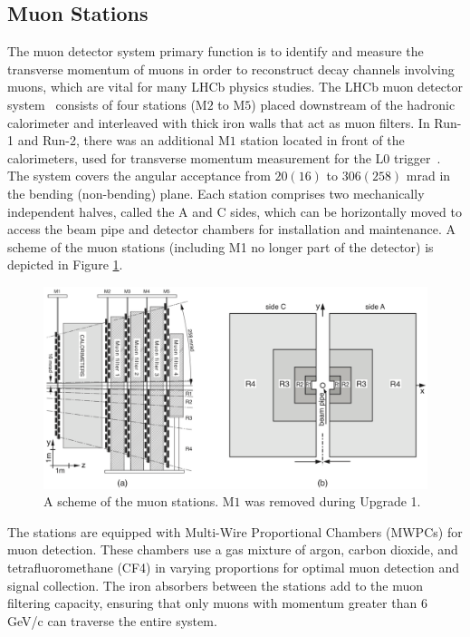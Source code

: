 \subsection{Muon Stations}

The muon detector system primary function is to identify and measure the transverse momentum of muons in order to reconstruct decay channels involving muons, which are vital for many LHCb physics studies.
The LHCb muon detector system~\cite{Alves_2013} consists of four stations (M$2$ to M$5$) placed downstream of the hadronic calorimeter and interleaved with thick iron walls that act as muon filters. In Run-1 and Run-2, there was an additional M$1$ station located in front of the calorimeters, used for transverse momentum measurement for the L$0$ trigger~\cite{muon_upgrade}. The system covers the angular acceptance from $20 (16)$ to $306 (258)$ mrad in the bending (non-bending) plane. Each station comprises two mechanically independent halves, called the A and C sides, which can be horizontally moved to access the beam pipe and detector chambers for installation and maintenance.
A scheme of the muon stations (including M1 no longer part of the detector) is depicted in Figure \ref{fig:muon}.
\begin{figure}
    \centering
    \includegraphics[width=\textwidth]{figures/muon.png}
    \caption{A scheme of the muon stations. M$1$ was removed during Upgrade 1.}
    \label{fig:muon}
\end{figure}
The stations are equipped with Multi-Wire Proportional Chambers (MWPCs) for muon detection. These chambers use a gas mixture of argon, carbon dioxide, and tetrafluoromethane (CF4) in varying proportions for optimal muon detection and signal collection. The iron absorbers between the stations add to the muon filtering capacity, ensuring that only muons with momentum greater than $6$ GeV/c can traverse the entire system.

